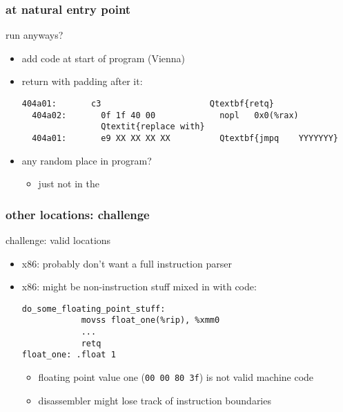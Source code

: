 \subsubsection{at natural entry point}

\begin{frame}[fragile,label=runAnyways]{run anyways?}
    \begin{itemize}
    \item add code at start of program (Vienna)
    \item return with padding after it:
\begin{Verbatim}[fontsize=\fontsize{10}{11}\selectfont,commandchars=Q\{\}]
  404a01:       c3                      Qtextbf{retq}
  404a02:       0f 1f 40 00             nopl   0x0(%rax)
                Qtextit{replace with}
  404a01:       e9 XX XX XX XX          Qtextbf{jmpq    YYYYYYY}
\end{Verbatim}
    \item any random place in program?
        \begin{itemize}
        \item just not in the 
        \end{itemize}
    \end{itemize}
\end{frame}

\subsubsection{other locations: challenge}

\begin{frame}[fragile,label=findValidChallenge]{challenge: valid locations}
    \begin{itemize}
    \item x86: probably don't want a full instruction parser
    \item x86: might be non-instruction stuff mixed in with code:
\begin{lstlisting}[language=myasm,style=smaller]
do_some_floating_point_stuff:
            movss float_one(%rip), %xmm0
            ...
            retq
float_one: .float 1
\end{lstlisting}
    \begin{itemize}
        \item floating point value one ({\tt 00 00 80 3f}) is not valid machine code
        \item disassembler might lose track of instruction boundaries
    \end{itemize}
    \end{itemize}
\end{frame}

